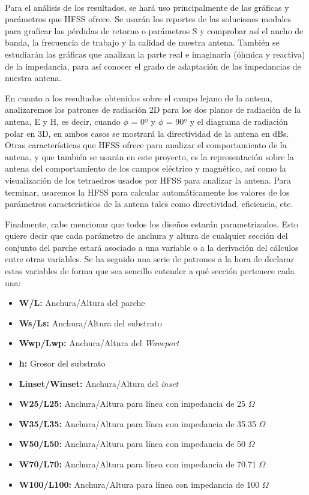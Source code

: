 \\
\par Para el análisis de los resultados, se hará uso principalmente  de las gráficas y parámetros que HFSS ofrece. Se usarán los reportes de las soluciones modales para graficar las pérdidas de retorno o parámetros S y comprobar así el ancho de banda, la frecuencia de trabajo y la calidad de nuestra antena. También se estudiarán las gráficas que analizan la parte real e imaginaria (óhmica y reactiva) de la impedancia, para así conocer el grado de adaptación de las impedancias de nuestra antena. 
\\
\par En cuanto a los resultados obtenidos sobre el campo lejano de la antena, analizaremos los patrones de radiación 2D para los dos planos de radiación de la antena, E y H, es decir, cuando $\phi $ = 0º y $\phi $ = 90º y el diagrama de radiación polar en 3D, en ambos casos se mostrará la directividad de la antena en dBs. Otras características que HFSS ofrece para analizar el comportamiento de la antena, y que también se usarán en este proyecto, es la representación sobre la antena del comportamiento de los campos eléctrico y magnético, así como la visualización de los tetraedros usados por HFSS para analizar la antena. Para terminar, usaremos la HFSS para calcular automáticamente los valores de los parámetros característicos de la antena tales como directividad, eficiencia, etc.
\\
\par Finalmente, cabe mencionar que todos los diseños estarán parametrizados. Esto quiere decir que cada parámetro de anchura y altura de cualquier sección del conjunto del parche estará asociado a una variable o a la derivación del cálculos entre otras variables. Se ha seguido una serie de patrones a la hora de declarar estas variables de forma que sea sencillo entender a qué sección pertenece cada una:

\begin{itemize}
\item \textbf{W/L: }Anchura/Altura del parche
\item \textbf{Ws/Ls: }Anchura/Altura del substrato
\item \textbf{Wwp/Lwp: }Anchura/Altura del \textit{Waveport}
\item \textbf{h: }Grosor del substrato
\item \textbf{Linset/Winset: }Anchura/Altura del \textit{inset}
\item \textbf{W25/L25: }Anchura/Altura para línea con impedancia de 25 $\Omega$
\item \textbf{W35/L35: }Anchura/Altura para línea con impedancia de 35.35 $\Omega$
\item \textbf{W50/L50: }Anchura/Altura para línea con impedancia de 50 $\Omega$
\item \textbf{W70/L70: }Anchura/Altura para línea con impedancia de 70.71 $\Omega$
\item \textbf{W100/L100: }Anchura/Altura para línea con impedancia de 100 $\Omega$
\end{itemize}

